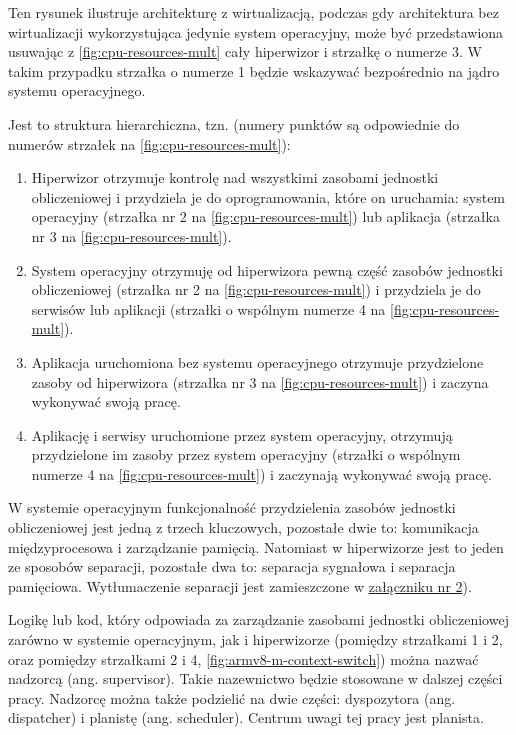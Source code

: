 \documentclass[../../main]{subfiles}
\begin{document}
Ten rysunek ilustruje architekturę z wirtualizacją, podczas gdy architektura bez wirtualizacji wykorzystująca jedynie system operacyjny, może być przedstawiona usuwając z \cref{fig:cpu-resources-mult} cały hiperwizor i strzałkę o numerze 3. W takim przypadku strzałka o numerze 1 będzie wskazywać bezpośrednio na jądro systemu operacyjnego.

Jest to struktura hierarchiczna, tzn. (numery punktów są odpowiednie do numerów strzałek na \cref{fig:cpu-resources-mult}):

\begin{enumerate}
    \item Hiperwizor otrzymuje kontrolę nad wszystkimi zasobami jednostki obliczeniowej i przydziela je do oprogramowania, które on uruchamia: system operacyjny (strzałka nr 2 na \cref{fig:cpu-resources-mult}) lub aplikacja (strzałka nr 3 na \cref{fig:cpu-resources-mult}).
    \item System operacyjny otrzymuję od hiperwizora pewną część zasobów jednostki obliczeniowej (strzałka nr 2 na \cref{fig:cpu-resources-mult}) i przydziela je do serwisów lub aplikacji (strzałki o wspólnym numerze 4 na \cref{fig:cpu-resources-mult}).
    \item Aplikacja uruchomiona bez systemu operacyjnego otrzymuje przydzielone zasoby od hiperwizora (strzałka nr 3 na \cref{fig:cpu-resources-mult}) i zaczyna wykonywać swoją pracę.
    \item Aplikację i serwisy uruchomione przez system operacyjny, otrzymują przydzielone im zasoby przez system operacyjny (strzałki o wspólnym numerze 4 na \cref{fig:cpu-resources-mult}) i zaczynają wykonywać swoją pracę.
\end{enumerate}

W systemie operacyjnym funkcjonalność przydzielenia zasobów jednostki obliczeniowej jest jedną z trzech kluczowych, pozostałe dwie to: komunikacja międzyprocesowa i zarządzanie pamięcią. Natomiast w hiperwizorze jest to jeden ze sposobów separacji, pozostałe dwa to: separacja sygnałowa i separacja pamięciowa. Wytłumaczenie separacji jest zamieszczone w \hyperref[sec:zalacznik-2]{załączniku nr 2}).

Logikę lub kod, który odpowiada za zarządzanie zasobami jednostki obliczeniowej zarówno w systemie operacyjnym, jak i hiperwizorze (pomiędzy strzałkami 1 i 2, oraz pomiędzy strzałkami 2 i 4, \cref{fig:armv8-m-context-switch}) można nazwać nadzorcą (ang. supervisor). Takie nazewnictwo będzie stosowane w dalszej części pracy. Nadzorcę można także podzielić na dwie części: dyspozytora (ang. dispatcher) i planistę (ang. scheduler). Centrum uwagi tej pracy jest planista.
\newpage
\end{document}
